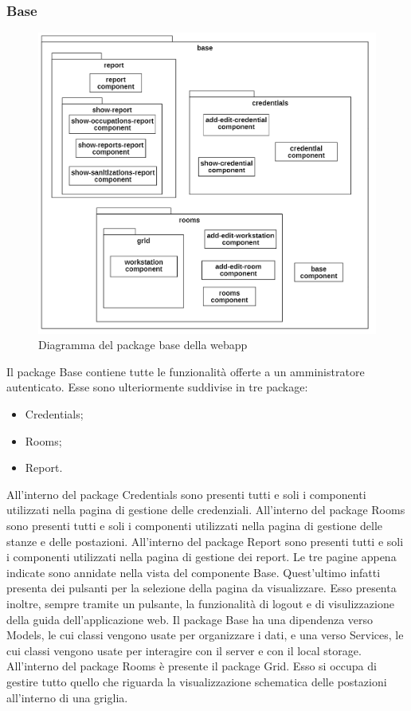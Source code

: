 \subsubsection{Base}
\begin{figure}[H]
	\centering
	\includegraphics[width=13cm]{res/images/webapp-base-diagrammaPackage.png}
	\caption{Diagramma del package base della webapp}
	\label{fig:DiagrammaPackageBaseWebapp}
\end{figure}
Il package Base contiene tutte le funzionalità offerte a un amministratore autenticato.
Esse sono ulteriormente suddivise in tre package:
\begin{itemize}
	\item Credentials;
	\item Rooms;
	\item Report.
\end{itemize}
All'interno del package Credentials sono presenti tutti e soli i componenti utilizzati nella pagina di gestione delle credenziali. All'interno del package Rooms sono presenti tutti e soli i componenti utilizzati nella pagina di gestione delle stanze e delle postazioni. All'interno del package Report sono presenti tutti e soli i componenti utilizzati nella pagina di gestione dei report. Le tre pagine appena indicate sono annidate nella vista del componente Base. Quest'ultimo infatti presenta dei pulsanti per la selezione della pagina da visualizzare. Esso presenta inoltre, sempre tramite un pulsante, la funzionalità di logout e di visulizzazione della guida dell'applicazione web. \newline
Il package Base ha una dipendenza verso Models, le cui classi vengono usate per organizzare i dati, e una verso Services, le cui classi vengono usate per interagire con il server e con il local storage.
All'interno del package Rooms è presente il package Grid. Esso si occupa di gestire tutto quello che riguarda la visualizzazione schematica delle postazioni all'interno di una griglia.


